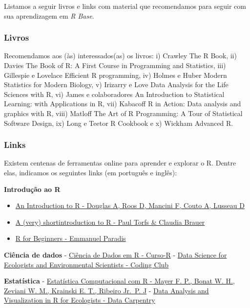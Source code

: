 \documentclass[
]{article}
\providecommand{\tightlist}{%
  \setlength{\itemsep}{0pt}\setlength{\parskip}{0pt}}
\begin{document}
Listamos a seguir livros e links com material que recomendamos para seguir com sua aprendizagem em \emph{R Base}.

\hypertarget{livros}{%
\subsubsection{Livros}\label{livros}}

Recomendamos aos (às) interessados(as) os livros: i) Crawley The R Book, ii) Davies The Book of R: A First Course in Programming and Statistics, iii) Gillespie e Lovelace Efficient R programming, iv) Holmes e Huber Modern Statistics for Modern Biology, v) Irizarry e Love Data Analysis for the Life Sciences with R, vi) James e colaboradores An Introduction to Statistical Learning: with Applications in R, vii) Kabacoff R in Action: Data analysis and graphics with R, viii) Matloff The Art of R Programming: A Tour of Statistical Software Design, ix) Long e Teetor R Cookbook e x) Wickham Advanced R.

\hypertarget{links}{%
\subsubsection{Links}\label{links}}

Existem centenas de ferramentas online para aprender e explorar o R. Dentre elas, indicamos os seguintes links (em português e inglês):

\textbf{Introdução ao R}

\begin{itemize}
\tightlist
\item
  \href{https://intro2r.com/}{An Introduction to R - Douglas A, Roos D, Mancini F, Couto A, Lusseau D}
\item
  \href{https://cran.r-project.org/doc/contrib/Torfs+Brauer-Short-R-Intro.pdf}{A (very) shortintroduction to R - Paul Torfs \& Claudia Brauer}
\item
  \href{https://rbasicsworkshop.weebly.com/uploads/1/8/6/0/18603232/paradis_2005_r-forbeginners.pdf}{R for Beginners - Emmanuel Paradis}
\end{itemize}

\textbf{Ciência de dados}
- \href{https://livro.curso-r.com/}{Ciência de Dados em R - Curso-R}
- \href{https://ourcodingclub.github.io/course}{Data Science for Ecologists and Environmental Scientists - Coding Club}

\textbf{Estatística}
- \href{http://cursos.leg.ufpr.br/ecr/index.html}{Estatística Computacional com R - Mayer F. P., Bonat W. H., Zeviani W. M., Krainski E. T., Ribeiro Jr.~P. J}
- \href{https://datacarpentry.org/R-ecology-lesson/index.html}{Data Analysis and Visualization in R for Ecologists - Data Carpentry}
\end{document}
